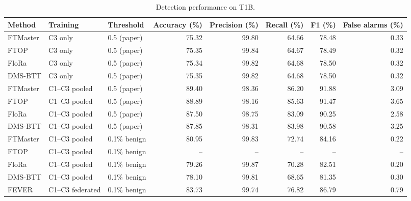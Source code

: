 \begin{table}[t]
\centering
\caption{Detection performance on T1B.}
\label{tab:detect}
\small
\begin{tabular}{lllrrrrr}
\toprule
Method & Training & Threshold & Accuracy (\%) & Precision (\%) & Recall (\%) & F1 (\%) & False alarms (\%) \\
\midrule
FTMaster & C3 only & 0.5 (paper) & 75.32 & 99.80 & 64.66 & 78.48 & 0.33 \\
FTOP & C3 only & 0.5 (paper) & 75.35 & 99.84 & 64.67 & 78.49 & 0.32 \\
FloRa & C3 only & 0.5 (paper) & 75.34 & 99.82 & 64.68 & 78.50 & 0.32 \\
DMS-BTT & C3 only & 0.5 (paper) & 75.35 & 99.82 & 64.68 & 78.50 & 0.32 \\
\midrule
FTMaster & C1--C3 pooled & 0.5 (paper) & 89.40 & 98.36 & 86.20 & 91.88 & 3.09 \\
FTOP & C1--C3 pooled & 0.5 (paper) & 88.89 & 98.16 & 85.63 & 91.47 & 3.65 \\
FloRa & C1--C3 pooled & 0.5 (paper) & 87.50 & 98.75 & 83.09 & 90.25 & 2.58 \\
DMS-BTT & C1--C3 pooled & 0.5 (paper) & 87.85 & 98.31 & 83.98 & 90.58 & 3.25 \\
\midrule
FTMaster & C1--C3 pooled & 0.1\% benign & 80.95 & 99.83 & 72.74 & 84.16 & 0.22 \\
FTOP & C1--C3 pooled & 0.1\% benign & -- & -- & -- & -- & -- \\
FloRa & C1--C3 pooled & 0.1\% benign & 79.26 & 99.87 & 70.28 & 82.51 & 0.20 \\
DMS-BTT & C1--C3 pooled & 0.1\% benign & 78.10 & 99.81 & 68.65 & 81.35 & 0.30 \\
\midrule
FEVER & C1--C3 federated & 0.1\% benign & 83.73 & 99.74 & 76.82 & 86.79 & 0.79 \\
\bottomrule
\end{tabular}
\end{table}

